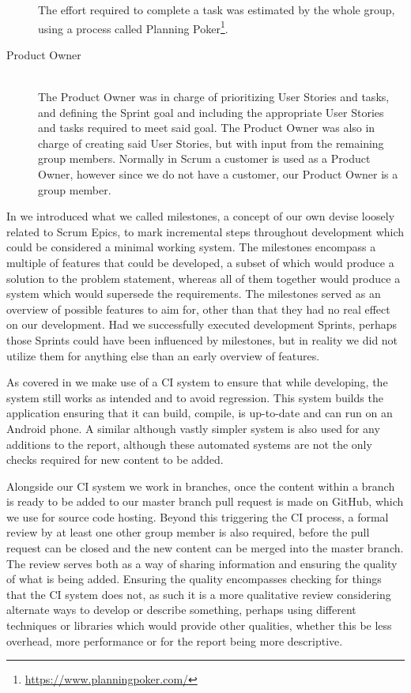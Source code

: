 \begin{description}
        The effort required to complete a task was estimated by the whole group, using a process called Planning Poker\footnote{\url{https://www.planningpoker.com/}}.
    \item [Product Owner] \hfill \\
        The Product Owner was in charge of prioritizing User Stories and tasks, and defining the Sprint goal and including the appropriate User Stories and tasks required to meet said goal.
        The Product Owner was also in charge of creating said User Stories, but with input from the remaining group members.
        Normally in Scrum a customer is used as a Product Owner, however since we do not have a customer, our Product Owner is a group member.
\end{description}

In  we introduced what we called milestones, a concept of our own devise loosely related to Scrum Epics, to mark incremental steps throughout development which could be considered a minimal working system.
The milestones encompass a multiple of features that could be developed, a subset of which would produce a solution to the problem statement, whereas all of them together would produce a system which would supersede the requirements.
The milestones served as an overview of possible features to aim for, other than that they had no real effect on our development.
Had we successfully executed development Sprints, perhaps those Sprints could have been influenced by milestones, but in reality we did not utilize them for anything else than an early overview of features.

\bigskip
As covered in  we make use of a \ac{CI} system to ensure that while developing, the system still works as intended and to avoid regression.
This system builds the application ensuring that it can build, compile, is up-to-date and can run on an Android phone.
A similar although vastly simpler system is also used for any additions to the report, although these automated systems are not the only checks required for new content to be added.

Alongside our \ac{CI} system we work in branches, once the content within a branch is ready to be added to our master branch pull request is made on GitHub, which we use for source code hosting.
Beyond this triggering the \ac{CI} process, a formal review by at least one other group member is also required, before the pull request can be closed and the new content can be merged into the master branch.
The review serves both as a way of sharing information and ensuring the quality of what is being added.
Ensuring the quality encompasses checking for things that the \ac{CI} system does not, as such it is a more qualitative review considering alternate ways to develop or describe something, perhaps using different techniques or libraries which would provide other qualities, whether this be less overhead, more performance or for the report being more descriptive.

